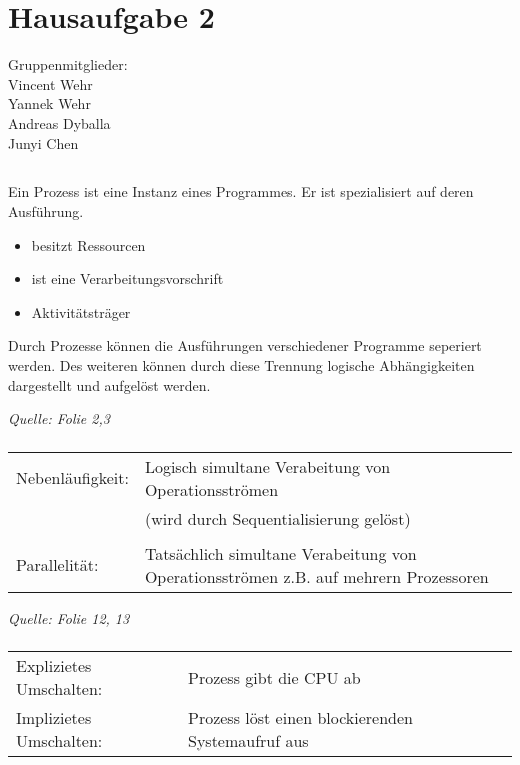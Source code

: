 \documentclass[a4paper]{article}
\newenvironment{quelle}{\medskip \noindent\itshape Quelle: }{\bigskip}
\begin{document}
\setcounter{section}{2}
\setcounter{subsection}{2}
\section*{Hausaufgabe 2}
Gruppenmitglieder:\\
Vincent Wehr\\
Yannek Wehr\\
Andreas Dyballa\\
Junyi Chen
\subsection{}
\subsubsection{}
Ein Prozess ist eine Instanz eines Programmes. Er ist spezialisiert auf deren Ausführung.
\begin{itemize}
  \item besitzt Ressourcen
  \item ist eine Verarbeitungsvorschrift
  \item Aktivitätsträger
\end{itemize}
Durch Prozesse können die Ausführungen verschiedener Programme seperiert werden. Des weiteren können durch 
diese Trennung logische Abhängigkeiten dargestellt und aufgelöst werden.

\begin{quelle} 
  Folie 2,3 
\end{quelle}

\subsubsection{}
\begin{tabular}{l l}
  Nebenläufigkeit: & Logisch simultane Verabeitung von Operationsströmen\\
  & (wird durch Sequentialisierung gelöst) \\ \\
  Parallelität: & Tatsächlich simultane Verabeitung von Operationsströmen z.B. auf mehrern Prozessoren
\end{tabular}

\begin{quelle}
  Folie 12, 13
\end{quelle}

\subsubsection{}
\begin{tabular}{ll}
  Explizietes Umschalten: 	& Prozess gibt die CPU ab \\
  Implizietes Umschalten:	& Prozess löst einen blockierenden Systemaufruf aus
\end{tabular}
\end{document}
